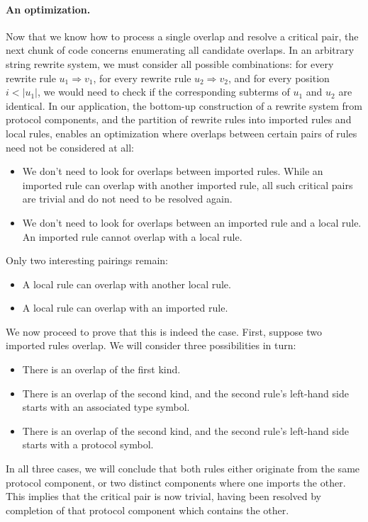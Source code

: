\documentclass[../generics]{subfiles}
\begin{document}
\paragraph{An optimization.} 
Now that we know how to process a single overlap and resolve a critical pair, the next chunk of code concerns enumerating all candidate overlaps. In an arbitrary string rewrite system, we must consider all possible combinations: for every rewrite rule $u_1\Rightarrow v_1$, for every rewrite rule $u_2\Rightarrow v_2$, and for every position $i<|u_1|$, we would need to check if the corresponding subterms of $u_1$ and $u_2$ are identical. In our application, the bottom-up construction of a rewrite system from protocol components, and the partition of rewrite rules into imported rules and local rules, enables an optimization where overlaps between certain pairs of rules need not be considered at all:
\begin{itemize}
\item We don't need to look for overlaps between imported rules. While an imported rule can overlap with another imported rule, all such critical pairs are trivial and do not need to be resolved again.
\item We don't need to look for overlaps between an imported rule and a local rule. An imported rule cannot overlap with a local rule.
\end{itemize}
Only two interesting pairings remain:
\begin{itemize}
\item A local rule can overlap with another local rule.
\item A local rule can overlap with an imported rule.
\end{itemize}

We now proceed to prove that this is indeed the case. First, suppose two imported rules overlap. We will consider three possibilities in turn:
\begin{itemize}
\item There is an overlap of the first kind.
\item There is an overlap of the second kind, and the second rule's left-hand side starts with an associated type symbol.
\item There is an overlap of the second kind, and the second rule's left-hand side starts with a protocol symbol.
\end{itemize}
In all three cases, we will conclude that both rules either originate from the same protocol component, or two distinct components where one imports the other. This implies that the critical pair is now trivial, having been resolved by completion of that protocol component which contains the other.
\end{document}
